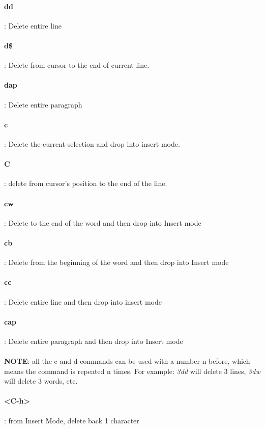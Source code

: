 \documentclass[10pt,letterpaper]{book}
\begin{document}
\paragraph{dd}: Delete entire line
\paragraph{d\$}: Delete from cursor to the end of current line.

\paragraph{dap}: Delete entire paragraph
\paragraph{c}: Delete the current selection and drop into insert mode.
\paragraph{C}: delete from cursor's position to the end of the line.

\paragraph{cw}: Delete to the end of the word and then drop into Insert mode
\paragraph{cb}: Delete from the beginning of the word and then drop into Insert mode
\paragraph{cc}: Delete entire line and then drop into insert mode
\paragraph{cap}: Delete entire paragraph and then drop into Insert mode
\\ \\
\textbf{NOTE}: all the c and d commands can be used with a number n before, which means the command is repeated n times. For example: \textit{3dd} will delete 3 lines, \textit{3dw} will delete 3 words, etc.
\paragraph{<C-h>}: from Insert Mode, delete back 1 character
\end{document}
